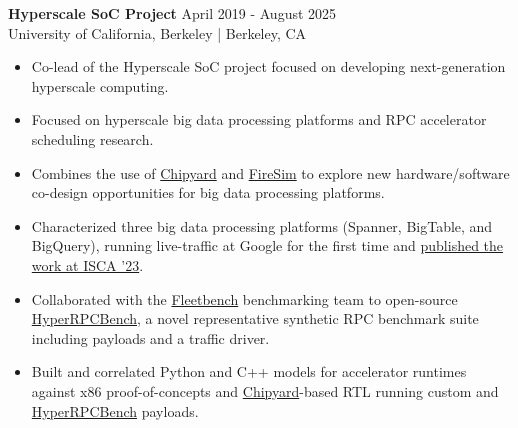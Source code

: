 \documentclass[line]{res}
\begin{document}
\begin{resume}
\label{sec:hyperscale-soc}
\textbf{Hyperscale SoC Project} \hfill April 2019 - August 2025
\\
University of California, Berkeley | Berkeley, CA
\\
\vspace{-3mm}
\begin{itemize}
\item Co-lead of the Hyperscale SoC project focused on developing next-generation hyperscale computing.
\item Focused on hyperscale big data processing platforms and RPC accelerator scheduling research.
\item Combines the use of \hyperref[sec:chipyard]{Chipyard} and \hyperref[sec:firesim]{FireSim} to explore new hardware/software co-design opportunities for big data processing platforms.
\item Characterized three big data processing platforms (Spanner, BigTable, and BigQuery), running live-traffic at Google for the first time and \hyperref[sec:iscapaper]{published the work at ISCA '23}.
\item Collaborated with the \href{https://github.com/google/fleetbench}{Fleetbench} benchmarking team to open-source \href{https://github.com/google/fleetbench/tree/cd20746b68b307b148a761c676d6400f2541082d/fleetbench/rpc}{HyperRPCBench}, a novel representative synthetic RPC benchmark suite including payloads and a traffic driver.
\item Built and correlated Python and C++ models for accelerator runtimes against x86 proof-of-concepts and \hyperref[sec:chipyard]{Chipyard}-based RTL running custom and \href{https://github.com/google/fleetbench/tree/cd20746b68b307b148a761c676d6400f2541082d/fleetbench/rpc}{HyperRPCBench} payloads.
\end{itemize}

\vspace{-2.4mm}


\end{resume}
\end{document}
